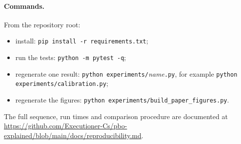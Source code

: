 \documentclass[11pt,a4paper]{article}
\begin{document}
\paragraph{Commands.} From the repository root:
\begin{itemize}\raggedright
\item install: \texttt{pip install -r requirements.txt};
\item run the tests: \texttt{python -m pytest -q};
\item regenerate one result: \texttt{python experiments/}\textit{name}\texttt{.py}, for example \texttt{python experiments/calibration.py};
\item regenerate the figures: \texttt{python experiments/build\_paper\_figures.py}.
\end{itemize}
The full sequence, run times and comparison procedure are documented at \url{https://github.com/Executioner-Cs/pbo-explained/blob/main/docs/reproducibility.md}.
\end{document}
